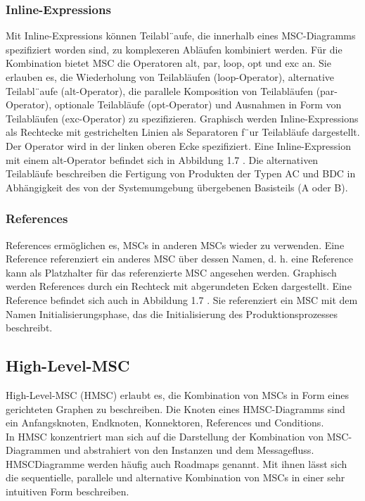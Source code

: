 \subsubsection{Inline-Expressions}
Mit Inline-Expressions können Teilabl¨aufe, die innerhalb
eines MSC-Diagramms spezifiziert worden sind, zu komplexeren
Abläufen kombiniert werden. Für die Kombination
bietet MSC die Operatoren alt, par, loop, opt und exc an. Sie erlauben es, die Wiederholung von Teilabläufen
(loop-Operator), alternative Teilabl¨aufe (alt-Operator), die
parallele Komposition von Teilabläufen (par-Operator), optionale
Teilabläufe (opt-Operator) und Ausnahmen in Form
von Teilabläufen (exc-Operator) zu spezifizieren. Graphisch
werden Inline-Expressions als Rechtecke mit gestrichelten
Linien als Separatoren f¨ur Teilabläufe dargestellt. Der Operator
wird in der linken oberen Ecke spezifiziert.
Eine Inline-Expression mit einem alt-Operator befindet
sich in Abbildung 1.7 . Die alternativen Teilabläufe beschreiben
die Fertigung von Produkten der Typen AC und BDC in
Abhängigkeit des von der Systemumgebung übergebenen
Basisteils (A oder B).\\
\subsubsection{References}
References ermöglichen es, MSCs in anderen MSCs wieder
zu verwenden. Eine Reference referenziert ein anderes
MSC über dessen Namen, d. h. eine Reference kann als
Platzhalter für das referenzierte MSC angesehen werden.
Graphisch werden References durch ein Rechteck mit abgerundeten
Ecken dargestellt. Eine Reference befindet sich
auch in Abbildung 1.7 . Sie referenziert ein MSC mit dem Namen
Initialisierungsphase, das die Initialisierung
des Produktionsprozesses beschreibt.\\
\subsection{High-Level-MSC}
High-Level-MSC (HMSC) erlaubt es, die Kombination von
MSCs in Form eines gerichteten Graphen zu beschreiben.
Die Knoten eines HMSC-Diagramms sind ein Anfangsknoten, Endknoten, Konnektoren, References und Conditions.
\\ In HMSC konzentriert man sich auf die Darstellung
der Kombination von MSC-Diagrammen und abstrahiert
von den Instanzen und dem Messagefluss. HMSCDiagramme
werden häufig auch Roadmaps genannt. Mit
ihnen lässt sich die sequentielle, parallele und alternative
Kombination von MSCs in einer sehr intuitiven Form beschreiben.\\

